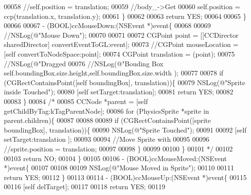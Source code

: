 \begin{DoxyCode}
{00058         \textcolor{comment}{//self.position = translation;}
00059         \textcolor{comment}{//body\_->Get}
00060         \textcolor{keyword}{self}.position = ccp(translation.x, translation.y);
00061     \}
00062     
00063     \textcolor{keywordflow}{return} YES;
00064     
00065 \}
00066 
00067 - (BOOL)ccMouseDown:(NSEvent *)event\{
00068     
00069     \textcolor{comment}{//NSLog(@"Mouse Down");}
00070     
00071     
00072     CGPoint point = [[CCDirector sharedDirector] convertEventToGL:event];
00073     \textcolor{comment}{//CGPoint mouseLocation = [self convertToNodeSpace:point];}
00074     CGPoint translation = (point);
00075     \textcolor{comment}{//NSLog(@"Dragged %
00076     \textcolor{comment}{//NSLog(@"Bouding Box %
       self.boundingBox.size.height,self.boundingBox.size.width );}
00077     
00078     \textcolor{keywordflow}{if} (CGRectContainsPoint([\textcolor{keyword}{self} boundingBox], translation))\{
00079         NSLog(\textcolor{stringliteral}{@"Sprite inside Touched"});
00080         [\textcolor{keyword}{self} setTarget:translation];
00081         \textcolor{keywordflow}{return} YES;
00082         
00083     \}
00084     \textcolor{comment}{/*}
00085 \textcolor{comment}{     CCNode *parent = [self getChildByTag:kTagParentNode];}
00086 \textcolor{comment}{     for (PhysicsSprite *sprite in parent.children)\{}
00087 \textcolor{comment}{     }
00088 \textcolor{comment}{     }
00089 \textcolor{comment}{     if (CGRectContainsPoint([sprite boundingBox], translation))\{}
00090 \textcolor{comment}{     NSLog(@"Sprite Touched");}
00091 \textcolor{comment}{     }
00092 \textcolor{comment}{     [self setTarget:translation ];}
00093 \textcolor{comment}{     }
00094 \textcolor{comment}{     //Move Sprite with}
00095 \textcolor{comment}{     }
00096 \textcolor{comment}{     //sprite.position = translation;}
00097 \textcolor{comment}{     }
00098 \textcolor{comment}{     \}}
00099 \textcolor{comment}{     }
00100 \textcolor{comment}{     \}}
00101 \textcolor{comment}{     */}
00102     
00103     \textcolor{keywordflow}{return} NO;
00104 \}
00105 
00106 - (BOOL)ccMouseMoved:(NSEvent *)event\{
00107     
00108     
00109     NSLog(\textcolor{stringliteral}{@"Mouse Moved in Sprite"});
00110     
00111     \textcolor{keywordflow}{return} YES;
00112 \}
00113 
00114 - (BOOL)ccMouseUp:(NSEvent *)event\{
00115     
00116     [\textcolor{keyword}{self} delTarget];
00117     
00118     \textcolor{keywordflow}{return} YES;
00119     
}}
\end{DoxyCode}
